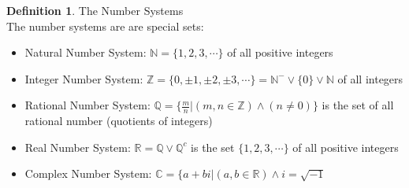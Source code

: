 \documentclass{book}
\theoremstyle{definition}
\newtheorem{definition}{Definition}[section]
\theoremstyle{remark}
\newcommand{\bb}[1]{\mathbb{#1}}
\begin{document}
\begin{definition}
The Number Systems \\

The number systems are are special sets: \\

    \begin{tcolorbox}
    \begin{itemize}
        \item Natural Number System: $\bb{N} = \{ 1, 2, 3, \cdots \}$ of all positive integers 
    	
    	\item Integer Number System: $\bb{Z} = \{0, \pm 1, \pm 2, \pm 3, \cdots \} = {\bb{N}}^- \vee \{0\} \vee \bb{N}$ of all integers
    	
    	\item Rational Number System: $\mathbb{Q} = \{ \frac{m}{n} | (m,n \in \bb{Z}) \wedge (n \neq 0)\}$ is the set of all rational number (quotients of integers) 
    	
    	\item Real Number System: $\bb{R} = \mathbb{Q} \vee {\mathbb{Q}}^c$ is the set $\{ 1, 2, 3, \cdots \}$ of all positive integers 
    	
    	\item  Complex Number System: $\bb{C} = \{ a+bi | (a,b \in \bb{R})\wedge i=\sqrt{-1}$
    \end{itemize}
    \end{tcolorbox}
\end{definition}
\end{document}
